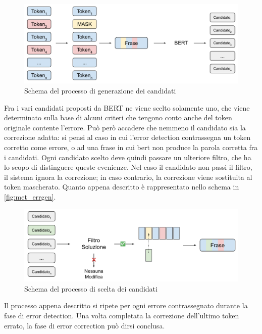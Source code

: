 \begin{figure}[H]
\centering
\includegraphics[width=\textwidth]{immagini/metodologia/generazione_candidati}
\caption{Schema del processo di generazione dei candidati}
\label{fig:met_errgen}
\end{figure}


Fra i vari candidati proposti da BERT ne viene scelto solamente uno, che viene determinato sulla base di alcuni criteri che tengono conto anche del token originale contente l'errore. Può però accadere che nemmeno il candidato sia la correzione adatta: si pensi al caso in cui l'error detection contrassegna un token corretto come errore, o ad una frase in cui bert non produce la parola corretta fra i candidati. Ogni candidato scelto deve quindi passare un ulteriore filtro, che ha lo scopo di distinguere queste evenienze. Nel caso il candidato non passi il filtro, il sistema ignora la correzione; in caso contrario, la correzione viene sostituita al token mascherato. Quanto appena descritto è rappresentato nello schema in \autoref{fig:met_errgen}.
\begin{figure}[H]
\centering
\includegraphics[width=\textwidth]{immagini/metodologia/scelta_candidati}
\caption{Schema del processo di scelta dei candidati}
\label{fig:met_errgen}
\end{figure}
Il processo appena descritto si ripete per ogni errore contrassegnato durante la fase di error detection. Una volta completata la correzione dell'ultimo token errato, la fase di error correction può dirsi conclusa.





